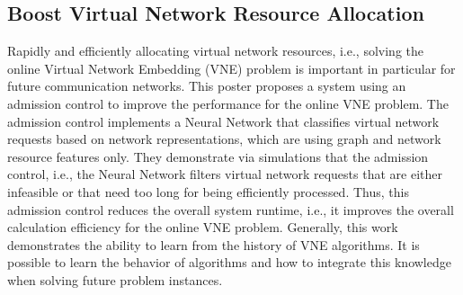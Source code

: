 




\subsection{Boost Virtual Network Resource Allocation}

Rapidly and efficiently allocating virtual network resources, i.e., solving
the online Virtual Network Embedding (VNE) problem is important in particular
for future communication networks. This poster proposes a system
\cite{ablenk:cnsm:2016} using an admission control to improve the performance
for the online VNE problem. The admission control implements a Neural Network
that classifies virtual network requests based on network representations,
which are using graph and network resource features only. They demonstrate via
simulations that the admission control, i.e., the Neural Network filters
virtual network requests that are either infeasible or that need too long for
being efficiently processed. Thus, this admission control reduces the overall
system runtime, i.e., it improves the overall calculation efficiency for the
online VNE problem.  Generally, this work demonstrates the ability to learn
from the history of VNE algorithms. It is possible to learn the behavior of
algorithms and how to integrate this knowledge when solving future problem
instances.

